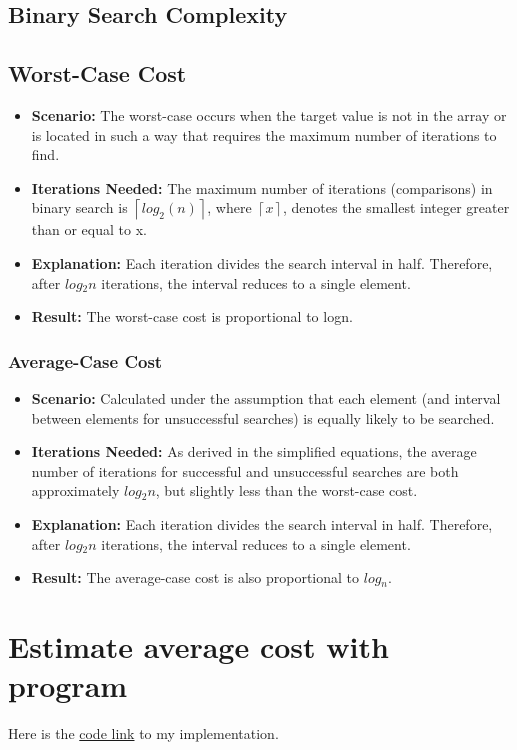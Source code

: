 \documentclass{article}
\begin{document}
\subsection{Binary Search Complexity}

\subsection{Worst-Case Cost}
\begin{itemize}
    \item \textbf{Scenario:} The worst-case occurs when the target value is not in the array or is located in such a way that requires the maximum number of iterations to find.
    \item {\textbf{Iterations Needed:} The maximum number of iterations (comparisons) in binary search is $\left \lceil {log_2 (n)}\right \rceil$, where $\left \lceil {x}\right \rceil$, denotes the smallest integer greater than or equal to x.}
    \item {\textbf{Explanation:} Each iteration divides the search interval in half. Therefore, after $log⁡_2n$ iterations, the interval reduces to a single element.}
    \item \textbf{Result:} The worst-case cost is proportional to log⁡n.
\end{itemize}


\subsubsection{Average-Case Cost}
\begin{itemize}
    \item \textbf{Scenario:} Calculated under the assumption that each element (and interval between elements for unsuccessful searches) is equally likely to be searched.
    \item \textbf{Iterations Needed:} As derived in the simplified equations, the average number of iterations for successful and unsuccessful searches are both approximately $log⁡_2n$, but slightly less than the worst-case cost.
    \item \textbf{Explanation:} Each iteration divides the search interval in half. Therefore, after $log⁡_2n$ iterations, the interval reduces to a single element.
    \item \textbf{Result:} The average-case cost is also proportional to $log⁡_n$.
\end{itemize}


\section{Estimate average cost with program}
Here is the \href{https://github.com/Tony363/5511/blob/main/hw2/binary_search.py}{code link} to my implementation.
\newline
\end{document}
